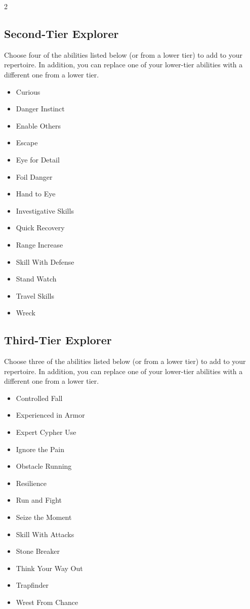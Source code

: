 \begin{multicols}{2}
\subsection{Second-Tier Explorer}

Choose four of the abilities listed below (or from a lower tier) to add to your repertoire. In addition, you can replace one of your lower-tier abilities with a different one from a lower tier.

\begin{itemize}
\item Curious
\item Danger Instinct
\item Enable Others
\item Escape
\item Eye for Detail 
\item Foil Danger
\item Hand to Eye
\item Investigative Skills
\item Quick Recovery
\item Range Increase
\item Skill With Defense
\item Stand Watch
\item Travel Skills
\item Wreck
\end{itemize}

\subsection{Third-Tier Explorer}

Choose three of the abilities listed below (or from a lower tier) to add to your repertoire. In addition, you can replace one of your lower-tier abilities with a different one from a lower tier.

\begin{itemize}
\item Controlled Fall
\item Experienced in Armor
\item Expert Cypher Use
\item Ignore the Pain
\item Obstacle Running
\item Resilience
\item Run and Fight
\item Seize the Moment
\item Skill With Attacks
\item Stone Breaker
\item Think Your Way Out
\item Trapfinder
\item Wrest From Chance
\end{itemize}


\end{multicols}
